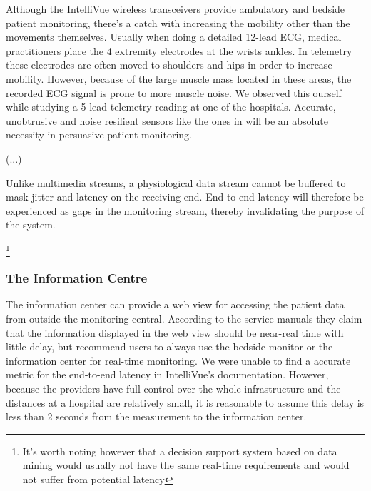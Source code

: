 Although the IntelliVue wireless transceivers provide ambulatory and bedside patient monitoring, there's a catch with increasing the mobility other than the movements themselves. Usually when doing a detailed 12-lead ECG, medical practitioners place the 4 extremity electrodes at the wrists ankles. In telemetry these electrodes are often moved to shoulders and hips in order to increase mobility. However, because of the large muscle mass located in these areas, the recorded ECG signal is prone to more muscle noise. We observed this ourself while studying a 5-lead telemetry reading at one of the hospitals. Accurate, unobtrusive and noise resilient sensors like the ones in \cite{007_EEG/ECG_sensor,2006_Wearable_Contactless_ECG,2009_Muscle_Noise_Cancellation_in_Four-Lead_ECG_System_for_Ubiquitous_Healthcare} will be an absolute necessity in persuasive patient monitoring. 

(...)

Unlike multimedia streams, a physiological data stream cannot be buffered to mask jitter and latency on the receiving end. End to end latency will therefore be experienced as gaps in the monitoring stream, thereby invalidating the purpose of the system.


\footnote{It's worth noting however that a decision support system based on data mining would usually not have the same real-time requirements and would not suffer from potential latency}


\subsubsection{The Information Centre} %
\label{ssub:the_information_centre}

The information center can provide a web view for accessing the patient data from outside the monitoring central. According to the service manuals they claim that the information displayed in the web view should be near-real time with little delay, but recommend users to always use the bedside monitor or the information center for real-time monitoring. We were unable to find a accurate metric for the end-to-end latency in IntelliVue's documentation. However, because the providers have full control over the whole infrastructure and the distances at a hospital are relatively small, it is reasonable to assume this delay is less than 2 seconds from the measurement to the information center.

